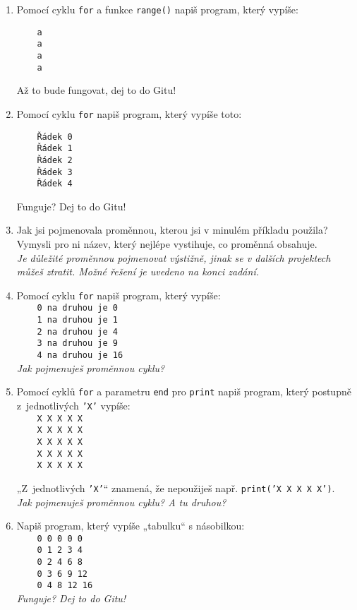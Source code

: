 \documentclass[a4paper,10pt]{article}
\begin{document}
\begin{enumerate}[resume]
\item Pomocí cyklu \verb+for+ a funkce \texttt{range()} napiš program, který vypíše:
\begin{verbatim}
    a
    a
    a
    a
\end{verbatim}
    Až to bude fungovat, dej to do Gitu!

\item Pomocí cyklu \verb+for+ napiš program, který vypíše toto:
\begin{verbatim}
    Řádek 0
    Řádek 1
    Řádek 2
    Řádek 3
    Řádek 4
\end{verbatim}
    Funguje? Dej to do Gitu!

\item Jak jsi pojmenovala proměnnou, kterou jsi v minulém příkladu použila?
    Vymysli pro ni název, který nejlépe vystihuje, co proměnná obsahuje.
    \\\emph{\small Je důležité proměnnou pojmenovat výstižně, jinak se v dalších projektech můžeš ztratit.
            Možné řešení je uvedeno na konci zadání.}
    \label{cisloradku}

\item Pomocí cyklu \verb+for+ napiš program, který vypíše:
\\\verb+    0 na druhou je 0+
\\\verb+    1 na druhou je 1+
\\\verb+    2 na druhou je 4+
\\\verb+    3 na druhou je 9+
\\\verb+    4 na druhou je 16+
    \\\emph{\small Jak pojmenuješ proměnnou cyklu?}

\item Pomocí cyklů \verb+for+ a parametru \verb+end+ pro \verb+print+ napiš
    program, který postupně z~jednotlivých \texttt{'X'} vypíše:
\\\verb+    X X X X X+
\\\verb+    X X X X X+
\\\verb+    X X X X X+
\\\verb+    X X X X X+
\\\verb+    X X X X X+

„Z~jednotlivých \texttt{'X'}“ znamená, že nepoužiješ např. \texttt{print('X X X X X')}.
    \\\emph{\small Jak pojmenuješ proměnnou cyklu? A tu druhou?}

\item Napiš program, který vypíše „tabulku“ s násobilkou:
\\\verb+    0 0 0 0 0+
\\\verb+    0 1 2 3 4+
\\\verb+    0 2 4 6 8+
\\\verb+    0 3 6 9 12+
\\\verb+    0 4 8 12 16+
    \\\emph{\small Funguje? Dej to do Gitu!}


\end{enumerate}
\end{document}
